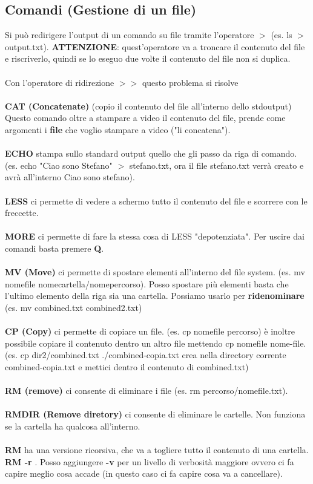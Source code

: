 \documentclass{article}
\begin{document}
\subsection{Comandi (Gestione di un file)}
Si può redirigere l'output di un comando su file tramite l'operatore \textbf{$>$} (es. ls $>$ output.txt). \textbf{ATTENZIONE}: quest'operatore va a troncare il contenuto del file e riscriverlo, quindi se lo eseguo due volte il contenuto del file non si duplica.\\\\
Con l'operatore di ridirezione $>>$ questo problema si risolve\\\\
\textbf{CAT (Concatenate)} (copio il contenuto del file all'interno dello stdoutput) Questo comando oltre a stampare a video il contenuto del file, prende come argomenti i \textbf{file} che voglio stampare a video ("li concatena").\\\\
\textbf{ECHO} stampa sullo standard output quello che gli passo da riga di comando. (es. echo "Ciao sono Stefano" $>$ stefano.txt, ora il file stefano.txt verrà creato e avrà all'interno Ciao sono stefano).\\\\
\textbf{LESS} ci permette di vedere a schermo tutto il contenuto del file e scorrere con le freccette.\\\\
\textbf{MORE} ci permette di fare la stessa cosa di LESS "depotenziata". Per uscire dai comandi basta premere \textbf{Q}.\\\\
\textbf{MV (Move)} ci permette di spostare elementi all'interno del file system. (es. mv nomefile nomecartella/nomepercorso). Posso spostare più elementi basta che l'ultimo elemento della riga sia una cartella. Possiamo usarlo per \textbf{ridenominare} (es. mv combined.txt combined2.txt)\\\\
\textbf{CP (Copy)} ci permette di copiare un file. (es. cp nomefile percorso) è inoltre possibile copiare il contenuto dentro un altro file mettendo cp nomefile nome-file. (es. cp dir2/combined.txt ./combined-copia.txt crea nella directory corrente combined-copia.txt e mettici dentro il contenuto di combined.txt)\\\\
\textbf{RM (remove)} ci consente di eliminare i file (es. rm percorso/nomefile.txt).\\\\
\textbf{RMDIR (Remove diretory)} ci consente di eliminare le cartelle. Non funziona se la cartella ha qualcosa all'interno.\\\\
\textbf{RM} ha una versione ricorsiva, che va a togliere tutto il contenuto di una cartella. \textbf{RM -r }. Posso aggiungere \textbf{-v} per un livello di verbosità maggiore ovvero ci fa capire meglio cosa accade (in questo caso ci fa capire cosa va a cancellare).
\end{document}
